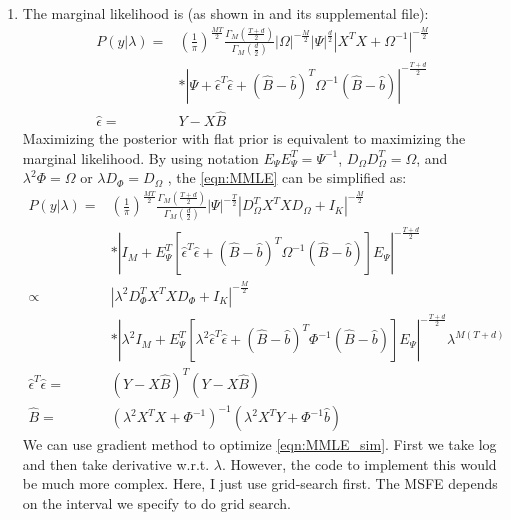 \documentclass[11pt, oneside]{article}   	%
\begin{document}
\begin{enumerate}[(1)]
\item
The marginal likelihood is (as shown in \cite{giannone2016priors} and its supplemental file):
\begin{align}
P (y| \lambda) = &(\frac{1}{ \pi}) ^{\frac{MT}{2}} \frac{ \Gamma _{M} (\frac{T+d}{2})}{ \Gamma _{M} (\frac{d}{2})}| \Omega| ^{-\frac{M}{2}} | \Psi| ^{\frac{d}{2}} |X^TX + \Omega ^{-1}| ^{-\frac{M}{2}} \nonumber \\   &* | \Psi + \hat { \epsilon}^T\hat { \epsilon} + (\hat {B}-\hat {b})^T \Omega ^{-1}(\hat {B}-\hat {b})| ^ {-\frac{T+d}{2}} \label{eqn:MMLE}\\
\hat { \epsilon} =& Y - X\hat {B} \nonumber
\end{align}
Maximizing the posterior with flat prior is equivalent to maximizing the marginal likelihood. By using notation $E _{ \Psi}E _{ \Psi}^T = \Psi ^{-1}$, $D _{ \Omega}D _{ \Omega}^T = \Omega$, and $ \lambda^2 \Phi = \Omega$ or $ \lambda D _{ \Phi} = D _{ \Omega}$ , the \ref{eqn:MMLE} can be simplified as:
\begin{align}
P (y| \lambda) = &(\frac{1}{ \pi}) ^{\frac{MT}{2}} \frac{ \Gamma _{M} (\frac{T+d}{2})}{ \Gamma _{M} (\frac{d}{2})} | \Psi| ^{-\frac{T}{2}} \left|D _{ \Omega}^TX^TXD _{ \Omega} + I _{K}\right| ^{-\frac{M}{2}} \nonumber \\   &* \left| I_{M} + E _{ \Psi}^T\left[ \hat { \epsilon}^T\hat { \epsilon} + (\hat {B}-\hat {b})^T \Omega ^{-1}(\hat {B}-\hat {b})\right ] E _{ \Psi} \right| ^ {-\frac{T+d}{2}} \nonumber \\
\propto & \left| \lambda^2 D _{ \Phi}^TX^TXD _{ \Phi} + I _{K}\right| ^{-\frac{M}{2}} \nonumber \\   &* \left| \lambda^2 I_{M} + E _{ \Psi}^T\left[ \lambda^2 \hat { \epsilon}^T\hat { \epsilon} + (\hat {B}-\hat {b})^T \Phi ^{-1}(\hat {B}-\hat {b})\right ] E _{ \Psi} \right| ^ {-\frac{T+d}{2}} \lambda ^{M(T+d)} \label{eqn:MMLE_sim} \\
\hat { \epsilon}^T\hat { \epsilon} =& (Y-X\hat {B})^T(Y-X\hat {B}) \nonumber \\
\hat {B} = & (\lambda^2X^TX+ \Phi ^{-1}) ^{-1} (\lambda^2 X^TY + \Phi ^{-1} \hat{b}) \nonumber
\end{align}
We can use gradient method to optimize \ref{eqn:MMLE_sim}. First we take log and then take derivative w.r.t. $\lambda$. However, the code to implement this would be much more complex. Here, I just use grid-search first. 
The MSFE depends on the interval we specify to do grid search.
\begin{table}[!ht]

\end{table}
\end{enumerate}
\end{document}
